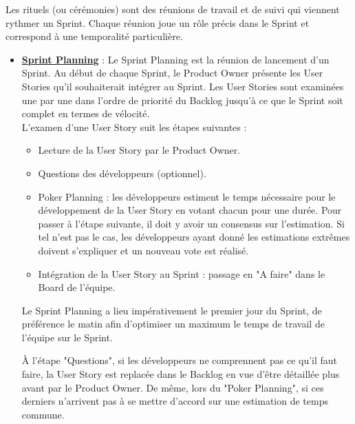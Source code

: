 Les rituels (ou cérémonies) sont des réunions de travail et de suivi qui viennent rythmer un Sprint. Chaque réunion joue un rôle précis dans le Sprint et correspond à une temporalité particulière.
\begin{itemize}
    \item \textbf{\underline{Sprint Planning}} : Le Sprint Planning est la réunion de lancement d'un Sprint. Au début de chaque Sprint, le Product Owner présente les User Stories qu'il souhaiterait intégrer au Sprint. Les User Stories sont examinées une par une dans l'ordre de priorité du Backlog jusqu'à ce que le Sprint soit complet en termes de vélocité.\\
    L'examen d'une User Story suit les étapes suivantes :
\begin{itemize}
    \item Lecture de la User Story par le Product Owner.
    \item Questions des développeurs (optionnel).
    \item Poker Planning : les développeurs estiment le temps nécessaire pour le développement de la User Story en votant chacun pour une durée. Pour passer à l'étape suivante, il doit y avoir un consensus sur l'estimation. Si tel n'est pas le cas, les développeurs ayant donné les estimations extrêmes doivent s'expliquer et un nouveau vote est réalisé.
    \item Intégration de la User Story au Sprint : passage en "A faire" dans le Board de l'équipe.
\end{itemize}
\begin{beware}[borderline west={5pt}{0pt}{olive3}, coltitle={olive3}, title=Note : ]
    Le Sprint Planning a lieu impérativement le premier jour du Sprint, de préférence le matin afin d'optimiser un maximum le temps de travail de l'équipe sur le Sprint.
\end{beware}
\begin{beware}[title=Remarque : ]
À l'étape "Questions", si les développeurs ne comprennent pas ce qu'il faut faire, la User Story est replacée dans le Backlog en vue d'être détaillée plus avant par le Product Owner.
De même, lors du "Poker Planning", si ces derniers n'arrivent pas à se mettre d'accord sur une estimation de temps commune.
\end{beware}


\end{itemize}
